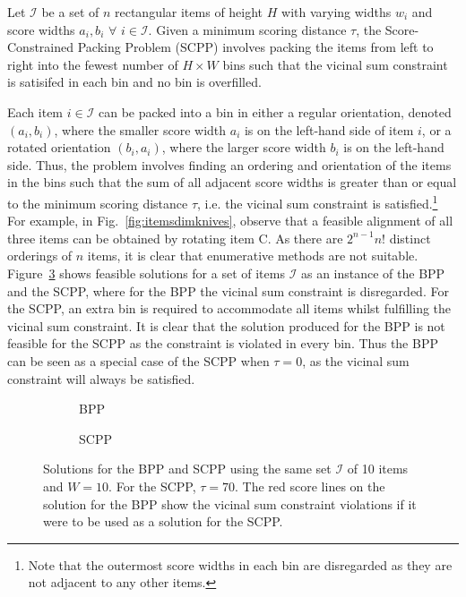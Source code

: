 \documentclass[authoryear]{elsarticle}
\begin{document}
\begin{definition}
	Let $\mathcal{I}$ be a set of $n$ rectangular items of height $H$ with varying widths $w_i$ and score widths $a_i, b_i$ $\forall$ $i \in \mathcal{I}$. Given a minimum scoring distance $\tau$, the Score-Constrained Packing Problem (SCPP) involves packing the items from left to right into the fewest number of $H \times W$ bins such that the vicinal sum constraint is satisifed in each bin and no bin is overfilled.
	\label{defn:scsp}
\end{definition}	

\noindent Each item $i \in \mathcal{I}$ can be packed into a bin in either a regular orientation, denoted $(a_i, b_i)$, where the smaller score width $a_i$ is on the left-hand side of item $i$, or a rotated orientation $(b_i, a_i)$, where the larger score width $b_i$ is on the left-hand side. Thus, the problem involves finding an ordering and orientation of the items in the bins such that the sum of all adjacent score widths is greater than or equal to the minimum scoring distance $\tau$, i.e. the vicinal sum constraint is satisfied.\footnote{Note that the outermost score widths in each bin are disregarded as they are not adjacent to any other items.} For example, in Fig.~\ref{fig:itemsdimknives}, observe that a feasible alignment of all three items can be obtained by rotating item C. As there are $2^{n-1} n!$ distinct orderings of $n$ items, it is clear that enumerative methods are not suitable. Figure~\ref{fig:bppvscpp} shows feasible solutions for a set of items $\mathcal{I}$ as an instance of the BPP and the SCPP, where for the BPP the vicinal sum constraint is disregarded. For the SCPP, an extra bin is required to accommodate all items whilst fulfilling the vicinal sum constraint. It is clear that the solution produced for the BPP is not feasible for the SCPP as the constraint is violated in every bin. Thus the BPP can be seen as a special case of the SCPP when $\tau=0$, as the vicinal sum constraint will always be satisfied.

\begin{figure}[H]
	\centering	
	\begin{subfigure}[h]{0.38\textwidth}
		
		\caption{BPP}
		\label{fig:bpp}
	\end{subfigure} \hspace{15mm}
	\begin{subfigure}[h]{0.38\textwidth}
		
		\caption{SCPP}
		\label{fig:scpp}
	\end{subfigure}
	\caption{Solutions for the BPP and SCPP using the same set $\mathcal{I}$ of 10 items and $W = 10$. For the SCPP, $\tau = 70$. The red score lines on the solution for the BPP show the vicinal sum constraint violations if it were to be used as a solution for the SCPP.}	
	\label{fig:bppvscpp}
\end{figure}
\end{document}

